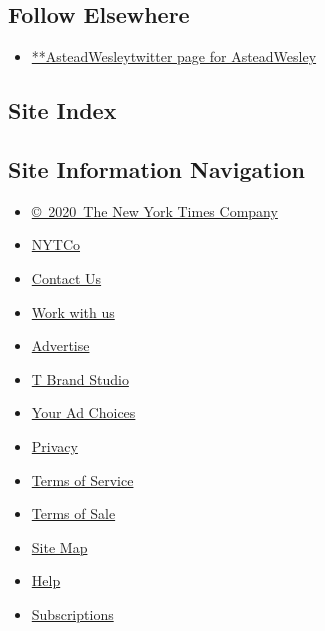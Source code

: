 \hypertarget{follow-elsewhere}{%
\subsection{Follow Elsewhere}\label{follow-elsewhere}}

\begin{itemize}
\tightlist
\item
  \href{https://twitter.com/AsteadWesley}{**AsteadWesleytwitter page for
  AsteadWesley}
\end{itemize}

\hypertarget{site-index}{%
\subsection{Site Index}\label{site-index}}

\hypertarget{site-information-navigation}{%
\subsection{Site Information
Navigation}\label{site-information-navigation}}

\begin{itemize}
\tightlist
\item
  \href{https://help.nytimes3xbfgragh.onion/hc/en-us/articles/115014792127-Copyright-notice}{©~2020~The
  New York Times Company}
\end{itemize}

\begin{itemize}
\tightlist
\item
  \href{https://www.nytco.com/}{NYTCo}
\item
  \href{https://help.nytimes3xbfgragh.onion/hc/en-us/articles/115015385887-Contact-Us}{Contact
  Us}
\item
  \href{https://www.nytco.com/careers/}{Work with us}
\item
  \href{https://nytmediakit.com/}{Advertise}
\item
  \href{http://www.tbrandstudio.com/}{T Brand Studio}
\item
  \href{https://www.nytimes3xbfgragh.onion/privacy/cookie-policy\#how-do-i-manage-trackers}{Your
  Ad Choices}
\item
  \href{https://www.nytimes3xbfgragh.onion/privacy}{Privacy}
\item
  \href{https://help.nytimes3xbfgragh.onion/hc/en-us/articles/115014893428-Terms-of-service}{Terms
  of Service}
\item
  \href{https://help.nytimes3xbfgragh.onion/hc/en-us/articles/115014893968-Terms-of-sale}{Terms
  of Sale}
\item
  \href{https://spiderbites.nytimes3xbfgragh.onion}{Site Map}
\item
  \href{https://help.nytimes3xbfgragh.onion/hc/en-us}{Help}
\item
  \href{https://www.nytimes3xbfgragh.onion/subscription?campaignId=37WXW}{Subscriptions}
\end{itemize}
